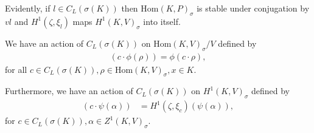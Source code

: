	Evidently, if $l \in C_L\left(\sigma(K)\right)$ then $\mathrm{Hom}(K, P)_\sigma$ is stable under conjugation by $vl$ and $H^1(\zeta, \xi_l)$ maps $H^1(K, V)_{\sigma}$ into itself.

	\begin{lemma} We have an action of $C_L(\sigma(K))$ on $\mathrm{Hom}(K, V)_\sigma / V$ defined by
		\begin{align} \label{vcl.hom}
			(c \cdot \phi(\rho)) = \phi\left(c \cdot \rho \right),
		\end{align}
		for all $c \in C_L(\sigma(K)), \rho \in \mathrm{Hom}(K, V)_\sigma, x \in K$.
		
		Furthermore, we have an action of $C_L(\sigma(K))$ on $H^1(K, V)_\sigma$ defined by
		\begin{align} \label{cl.h1}
			\left(c \cdot \psi(\alpha)\right)
			&= H^1(\zeta, \xi_c)\left(\psi(\alpha)\right), 
		\end{align}
		for $c \in C_L(\sigma(K)), \alpha \in Z^1(K, V)_\sigma$.
	\end{lemma}
